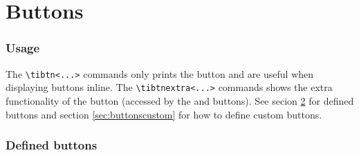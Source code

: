 \documentclass[a4paper,12pt]{article}
\begin{document}
\part{Buttons}

\section{Usage}

The \verb|\tibtn<...>| commands only prints the button and are useful when
displaying buttons inline. The \verb|\tibtnextra<...>| commands shows the extra
functionality of the button (accessed by the \tibtnsecond{} and \tibtnalpha{}
buttons). See secion \ref{sec:button} for defined buttons and section
\ref{sec:buttonscustom} for how to define custom buttons.

\section{Defined buttons} \label{sec:button}
\end{document}

